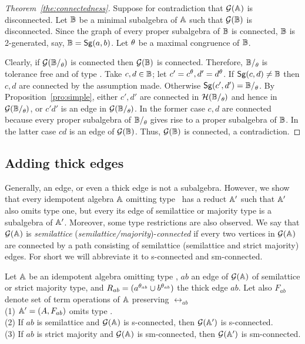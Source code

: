 \documentclass[11pt]{article}
\begin{document}
\begin{proof}[Theorem~\ref{the:connectedness}]
Suppose for contradiction that ${\mathcal G}({\mathbb A})$ is disconnected. Let
${\mathbb B}$ be a minimal subalgebra of ${\mathbb A}$ such that ${\mathcal G}({\mathbb B})$ is
disconnected. Since the graph of every proper subalgebra of ${\mathbb B}$ is
connected, ${\mathbb B}$ is 2-generated, say, ${\mathbb B}={\sf Sg}(a,b)$. 
Let $\theta$ be a maximal congruence of ${\mathbb B}$. 

Clearly, if $\cG(\zB\fac\th)$ is connected then ${\mathcal G}({\mathbb B})$ is
connected. Therefore, $\zB\fac\th$ is tolerance free and of type \three. Take
$c,d\in{\mathbb B}$; let $c'=c^\theta, d'=d^\theta$. If ${\sf Sg}(c,d)\ne{\mathbb B}$ then
$c,d$ are connected by the assumption made. Otherwise
$\Sg{c',d'}=\zB\fac\th$. By Proposition~\ref{pro:simple}, either
$c',d'$ are connected in $\cH(\zB\fac\th)$ and hence in $\cG(\zB\fac\th)$,
or $c'd'$ is an edge in $\cG(\zB\fac\th)$. In the former case $c,d$
are connected because every proper subalgebra of 
$\zB\fac\th$ gives rise to a proper subalgebra of ${\mathbb B}$. In the latter
case $cd$ is an edge of ${\mathcal G}({\mathbb B})$. Thus, ${\mathcal G}({\mathbb B})$ is connected, a
contradiction. 
\end{proof}

\subsection{Adding thick edges}\label{sec:adding-thick}

Generally, an edge, or even a thick edge is not a subalgebra. However, we show 
that every idempotent algebra ${\mathbb A}$ omitting type \one\ has a reduct ${\mathbb A}'$ such that
${\mathbb A}'$ also omits type one, but every its edge of semilattice or majority type is a 
subalgebra of ${\mathbb A}'$. Moreover, some type restrictions are also observed.
We say that ${\mathcal G}({\mathbb A})$ is {\em semilattice} ({\em semilattice/majority})-{\em connected} 
if every two vertices in ${\mathcal G}({\mathbb A})$ are connected by a path consisting of semilattice
(semilattice and strict majority) edges. For short we will abbreviate it to s-connected and 
sm-connected.
\begin{theorem}\label{the:adding}
Let ${\mathbb A}$ be an idempotent algebra omitting type \one, 
$ab$ an edge of ${\mathcal G}({\mathbb A})$ of semilattice or strict majority type, and
$R_{ab}=(a^{\theta_{ab}}\cup b^{\theta_{ab}})$ the thick edge $ab$.
Let also $F_{ab}$ denote set of term operations of ${\mathbb A}$ preserving $\rel_{ab}$\\[1mm]
(1) ${\mathbb A}'=(A,F_{ab})$ omits type \one.\\[1mm] 
(2) If $ab$ is semilattice and ${\mathcal G}({\mathbb A})$ is s-connected, then
${\mathcal G}({\mathbb A}')$ is s-connected.\\[1mm]
(3) If $ab$ is strict majority and ${\mathcal G}({\mathbb A})$ is sm-connected, then
${\mathcal G}({\mathbb A}')$ is sm-connected.
\end{theorem}
\end{document}
